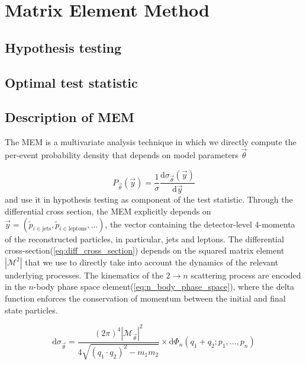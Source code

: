 \section{Matrix Element Method}
\label{sec:mem}

\subsection{Hypothesis testing}

\subsection{Optimal test statistic}
\label{sec:test_statistic}

\subsection{Description of MEM}

The MEM is a multivariate analysis technique in which we directly compute the per-event probability density that depends on model parameters $\vec{\theta}$

\begin{equation}
P_{\vec{\theta}}(\vec{y}) = \frac{1}{\sigma}
\frac{\mathrm{d}\sigma_{\vec{\theta}}(\vec{y})}{\mathrm{d}\vec{y}}
\end{equation}
and use it in hypothesis testing as component of the test statistic. Through the differential cross section, the MEM explicitly depends on $\vec{y} = (\tilde{p}_{i \in \mathrm{jets}}, \tilde{p}_{i \in \mathrm{leptons}}, \dots)$, the vector containing the detector-level 4-momenta of the reconstructed particles, in particular, jets and leptons. The differential cross-section(\cref{eq:diff_cross_section}) depends on the squared matrix element $|\mathcal{M}^2|$ that we use to directly take into account the dynamics of the relevant underlying processes. The kinematics of the $2 \rightarrow n$ scattering process are encoded in the $n$-body phase space element(\cref{eq:n_body_phase_space}), where the delta function enforces the conservation of momentum between the initial and final state particles.

\begin{equation}
\label{eq:diff_cross_section}
\mathrm{d}\sigma_{\vec{\theta}} = \frac{(2\pi)^4 |\mathcal{M}_{\vec{\theta}}|^2}{4 \sqrt{(q_1 \cdot q_2)^2 - m_1 m_2}} \times
\mathrm{d}\Phi_n(q_1 + q_2; p_1, \dots, p_{n})
\end{equation}

